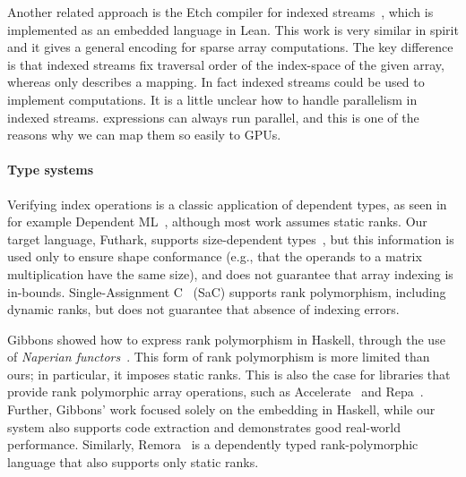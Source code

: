 Another related approach is the Etch compiler for indexed
streams~\cite{10.1145/3591268}, which is implemented as an embedded
language in Lean.  This work is very similar in spirit and it gives
a general encoding for sparse array computations.  The key difference
is that indexed streams fix traversal order of the index-space
of the given array, whereas  only describes a mapping.
In fact indexed streams could be used to implement 
computations.  It is a little unclear how to handle parallelism
in indexed streams.   expressions can always run parallel,
and this is one of the reasons why we can map them so easily to GPUs.


\paragraph{Type systems}

Verifying index operations is a classic application of dependent types, as seen
in for example Dependent ML~\cite{10.1145/292540.292560}, although most work
assumes static ranks. Our target language, Futhark, supports size-dependent
types~\cite{10.1145/3609024.3609412}, but this information is used only to
ensure shape conformance (e.g., that the operands to a matrix multiplication
have the same size), and does not guarantee that array indexing is in-bounds.
Single-Assignment C~\cite{sac2} (SaC) supports rank polymorphism, including
dynamic ranks, but does not guarantee that absence of indexing errors.

Gibbons showed how to express rank polymorphism in Haskell, through the use of
\emph{Naperian functors}~\cite{10.1145/2976022.2976023}. This form of rank
polymorphism is more limited than ours; in particular, it imposes static ranks.
This is also the case for libraries that provide rank polymorphic array
operations, such as Accelerate~\cite{10.1145/1926354.1926358} and
Repa~\cite{10.1145/1932681.1863582}. Further, Gibbons' work focused solely on
the embedding in Haskell, while our system also supports code extraction and
demonstrates good real-world performance. Similarly, Remora~\cite{rank-poly} is
a dependently typed rank-polymorphic language that also supports only static
ranks.
